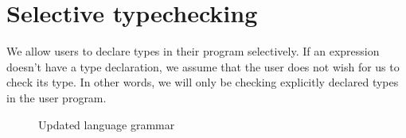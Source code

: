 \section{Selective typechecking}

We allow users to declare types in their program selectively. If an expression doesn't have a type declaration, we assume that the user does not wish for us to check its type. In other words, we will only be checking explicitly declared types in the user program.

\begin{figure}[hbt!]%
  \begin{grammar}
        \end{grammar}
    \caption{Updated language grammar}
    \label{fig_updatedGrammar}
\end{figure}




